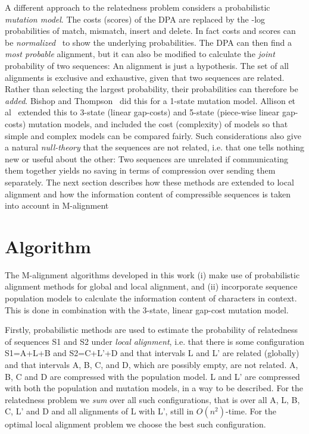 \documentclass[letterpaper,11pt,oneside]{article}
\begin{document}
\begin{multicols}{2}
A different approach to the relatedness problem
considers a probabilistic {\em mutation model}.
The costs (scores) of the DPA are replaced by the -log probabilities
of match, mismatch, insert and delete.
In fact costs and scores can be {\em normalized}~\cite{allison93a} to show
the underlying probabilities.
The DPA can then find a {\em most probable} alignment, but it can also
be modified to calculate the {\em joint} probability of two sequences:
An alignment is just a hypothesis.
The set of all alignments is exclusive and exhaustive, given that
two sequences are related.
Rather than selecting the largest probability,
their probabilities can therefore be {\em added}.
Bishop and Thompson~\cite{bishop86} did this for a 1-state mutation model.
Allison et al~\cite{allison92a} extended this to 3-state (linear gap-costs)
and 5-state (piece-wise linear gap-costs) mutation models,
and included the cost (complexity) of models so that simple
and complex models can be compared fairly.
Such considerations also give
a natural {\em null-theory} that the sequences are not related,
i.e. that one tells nothing new or useful about the other:
Two sequences are unrelated if
communicating them together yields no saving in terms
of compression over sending them separately.
The next section describes how these methods
are extended to local alignment and how the information
content of compressible sequences is taken into account in M-alignment


\section{Algorithm} \label{sec:alg}

The M-alignment algorithms developed in this work
(i) make use of probabilistic alignment methods
for global and local alignment, and
(ii) incorporate sequence population models to calculate
the information content of characters in context.
This is done in combination with the 3-state, linear gap-cost mutation model.

Firstly,
probabilistic methods are used to estimate the probability of relatedness
of sequences S1 and S2 under {\em local alignment}, i.e. that there is some
configuration S1=A+L+B and S2=C+L'+D and that intervals L and L' are
related (globally) and that intervals A, B, C, and D, which are possibly empty,
are not related.
A, B, C and D are compressed with the population model.
L and L' are compressed with both the population and mutation models,
in a way to be described.
For the relatedness problem we {\em sum} over all such configurations,
that is over all A, L, B, C, L' and D and all alignments of L with L',
still in $O(n^2)$-time.
For the optimal local alignment problem we choose the best such configuration.


\end{multicols}
\end{document}
